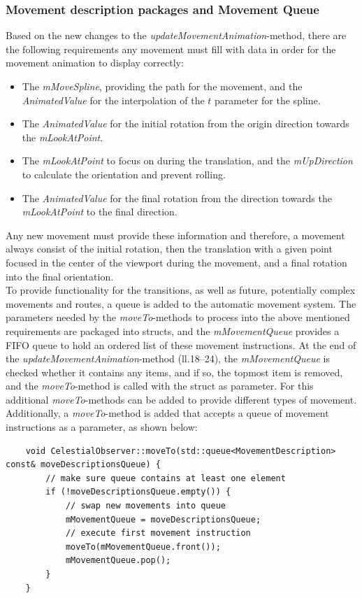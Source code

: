 \subsubsection{Movement description packages and Movement Queue}\label{subsubsec:movement-description-packages-and-movement-queue}

Based on the new changes to the \textit{updateMovementAnimation}-method, there are the following requirements any
movement must fill with data in order for the movement animation to display correctly:
\begin{itemize}
    \item The \textit{mMoveSpline}, providing the path for the movement, and the \textit{AnimatedValue} for the
    interpolation of the $t$ parameter for the spline.
    \item The \textit{AnimatedValue} for the initial rotation from the origin direction towards the
    \textit{mLookAtPoint}.
    \item The \textit{mLookAtPoint} to focus on during the translation, and the \textit{mUpDirection} to calculate
    the orientation and prevent rolling.
    \item The \textit{AnimatedValue} for the final rotation from the direction towards the \textit{mLookAtPoint} to
    the final direction.
\end{itemize}
Any new movement must provide these information and therefore, a movement always consist of the initial rotation,
then the translation with a given point focused in the center of the viewport during the movement, and a final
rotation into the final orientation.
\\
To provide functionality for the transitions, as well as future, potentially complex movements and routes, a queue is
added to the automatic movement system.
The parameters needed by the \textit{moveTo}-methods to process into the above mentioned requirements are packaged into
structs, and the \textit{mMovementQueue} provides a FIFO queue to hold an ordered list of these movement instructions.
At the end of the \textit{updateMovementAnimation}-method (ll.\@18--24), the
\textit{mMovementQueue} is checked whether it contains any items, and if so, the topmost item is removed, and the
\textit{moveTo}-method is called with the struct as parameter.
For this additional \textit{moveTo}-methods can be added to provide different types of movement.
Additionally, a \textit{moveTo}-method is added that accepts a queue of movement instructions as a parameter, as
shown below:
\begin{verbatim}
    void CelestialObserver::moveTo(std::queue<MovementDescription> const& moveDescriptionsQueue) {
        // make sure queue contains at least one element
        if (!moveDescriptionsQueue.empty()) {
            // swap new movements into queue
            mMovementQueue = moveDescriptionsQueue;
            // execute first movement instruction
            moveTo(mMovementQueue.front());
            mMovementQueue.pop();
        }
    }
\end{verbatim}

